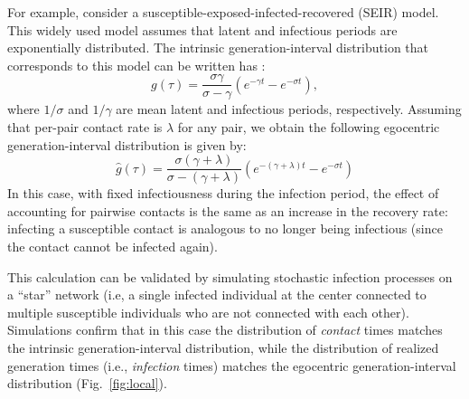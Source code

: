 \documentclass[12pt]{article}
\newcommand{\fref}[1]{Fig.~\ref{fig:#1}}
\begin{document}
For example, consider a susceptible-exposed-infected-recovered (SEIR) model.
This widely used model assumes that latent and infectious periods are exponentially distributed.
The intrinsic generation-interval distribution that corresponds to this model can be written has \citep{svensson2015influence}:
\begin{equation}
g(\tau) = \frac{\sigma \gamma}{\sigma - \gamma} \left(e^{-\gamma t} - e^{-\sigma t}\right),
\end{equation}
where $1/\sigma$ and $1/\gamma$ are mean latent and infectious periods, respectively.
Assuming that per-pair contact rate is $\lambda$ for any pair, we obtain the following egocentric generation-interval distribution is given by:
\begin{equation}
\hat{g}(\tau) = \frac{\sigma (\gamma + \lambda)}{\sigma - (\gamma + \lambda)} \left(e^{-(\gamma + \lambda)t} - e^{-\sigma t}\right)
\end{equation}
In this case, with fixed infectiousness during the infection period, the effect of accounting for pairwise contacts is the same as an increase in the recovery rate: infecting a susceptible contact is analogous to no longer being infectious (since the contact cannot be infected again). 

This calculation can be validated by simulating stochastic infection processes on a ``star'' network (i.e, a single infected individual at the center connected to multiple susceptible individuals who are not connected with each other).
Simulations confirm that in this case the distribution of \emph{contact} times matches the intrinsic generation-interval distribution, while the distribution of realized generation times (i.e., \emph{infection} times) matches the egocentric generation-interval distribution (\fref{local}).
\end{document}
